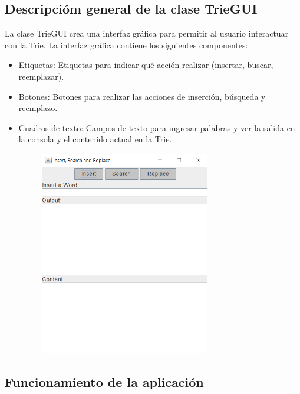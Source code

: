 \documentclass{article}
\begin{document}
	\subsection{Descripcióm general de la clase TrieGUI}
	La clase TrieGUI crea una interfaz gráfica para permitir al usuario interactuar con la Trie. 		    La interfaz gráfica contiene los siguientes componentes:
	\begin{itemize}
		\item Etiquetas: Etiquetas para indicar qué acción realizar (insertar, buscar, reemplazar).
		\item Botones: Botones para realizar las acciones de inserción, búsqueda y reemplazo.
		\item Cuadros de texto: Campos de texto para ingresar palabras y ver la salida en la consola y el contenido actual en la Trie.
		
		\begin{figure}[H]
		\centering
		\includegraphics[width=0.7\textwidth, height=0.7\textwidth,keepaspectratio]{pruebas/visual1.png}
	\end{figure}
	
	\end{itemize}
	\clearpage
	\subsection{Funcionamiento de la aplicación}
	
\end{document}
